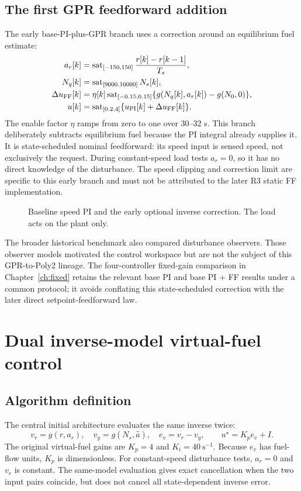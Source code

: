 \documentclass[11pt,a4paper,oneside]{report}
\newcommand{\sat}{\operatorname{sat}}
\newcommand{\blockfig}[3]{\begin{figure}[htbp]\centering\resizebox{.98\linewidth}{!}{#1}\caption{#2}\label{fig:#3}\end{figure}}
\begin{document}
\section{The first GPR feedforward addition}
The early base-PI-plus-GPR branch uses a correction around an equilibrium fuel estimate:
\begin{align}
a_r[k]&=\sat_{[-150,150]}\frac{r[k]-r[k-1]}{T_s},\\
N_q[k]&=\sat_{[9000,10000]}N_s[k],\\
\Delta u_{\rm FF}[k]&=\eta[k]\sat_{[-0.15,0.15]}
\{g(N_q[k],a_r[k])-g(N_0,0)\},\\
u[k]&=\sat_{[0.2,4]}\{u_{\rm PI}[k]+\Delta u_{\rm FF}[k]\}.
\end{align}
The enable factor $\eta$ ramps from zero to one over 30--32 s. This branch deliberately subtracts equilibrium fuel because the PI integral already supplies it. It is state-scheduled nominal feedforward: its speed input is sensed speed, not exclusively the request. During constant-speed load tests $a_r=0$, so it has no direct knowledge of the disturbance. The speed clipping and correction limit are specific to this early branch and must not be attributed to the later R3 static FF implementation.

\blockfig{\diagramBaseline}{Baseline speed PI and the early optional inverse correction. The load acts on the plant only.}{baseline}
The broader historical benchmark also compared disturbance observers. Those observer models motivated the control workspace but are not the subject of this GPR-to-Poly2 lineage. The four-controller fixed-gain comparison in Chapter~\ref{ch:fixed} retains the relevant base PI and base PI + FF results under a common protocol; it avoids conflating this state-scheduled correction with the later direct setpoint-feedforward law.

\chapter{Dual inverse-model virtual-fuel control}
\section{Algorithm definition}
The central initial architecture evaluates the same inverse twice:
\begin{equation}
v_r=g(r,a_r),\quad v_y=g(N_s,\hat a),\quad e_v=v_r-v_y,
\qquad u^\star=K_p e_v+I.
\label{eq:virtual}
\end{equation}
The original virtual-fuel gains are $K_p=4$ and $K_i=40\ \mathrm{s}^{-1}$. Because $e_v$ has fuel-flow units, $K_p$ is dimensionless. For constant-speed disturbance tests, $a_r=0$ and $v_r$ is constant. The same-model evaluation gives exact cancellation when the two input pairs coincide, but does not cancel all state-dependent inverse error.
\end{document}
